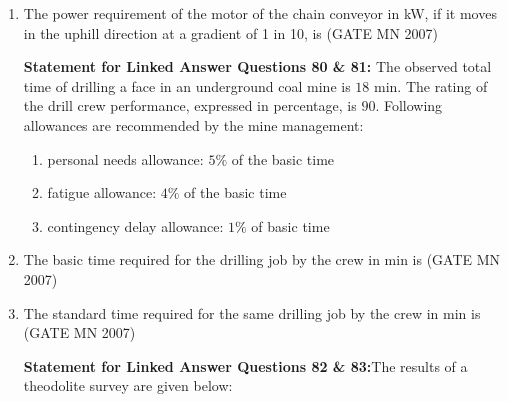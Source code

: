 \documentclass[journal]{IEEEtran}
\begin{document}
\begin{enumerate}
\item The power requirement of the motor of the chain conveyor in kW, if it moves in the uphill direction at a gradient of 1 in 10, is 
	\hfill (GATE MN 2007)
\begin{enumerate}
\end{enumerate}

\textbf{Statement for Linked Answer Questions 80 \& 81:} The observed total time of drilling a face in an underground coal mine is $18$ min. The rating of the drill crew performance, expressed in percentage, is $90$.  
Following allowances are recommended by the mine management:
\begin{enumerate}
\item personal needs allowance: $5\%$ of the basic time
\item fatigue allowance: $4\%$ of the basic time
\item contingency delay allowance: $1\%$ of basic time
\end{enumerate}

\item The basic time required for the drilling job by the crew in min is
	\hfill (GATE MN 2007)
\begin{enumerate}
\end{enumerate}

\item The standard time required for the same drilling job by the crew in min is
	\hfill (GATE MN 2007)
\begin{enumerate}
\end{enumerate}
\textbf{Statement for Linked Answer Questions 82 \& 83:}The results of a theodolite survey are given below:  


\end{enumerate}
\end{document}
